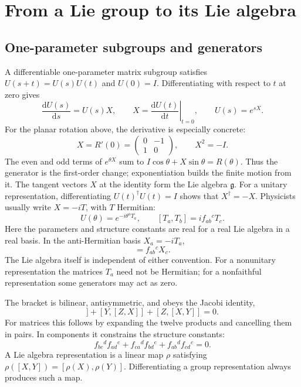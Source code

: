 \documentclass[11pt]{article}
\newcommand{\dd}{\mathrm{d}}
\newcommand{\lieg}{\mathfrak g}
\begin{document}
\section{From a Lie group to its Lie algebra}
\label{sec:algebra}
\subsection{One-parameter subgroups and generators}
A differentiable one-parameter matrix subgroup satisfies
\(U(s+t)=U(s)U(t)\) and \(U(0)=I\). Differentiating with respect to \(t\)
at zero gives
\[
\frac{\dd U(s)}{\dd s}=U(s)X,
\qquad X=\left.\frac{\dd U(t)}{\dd t}\right|_{t=0},
\qquad U(s)=e^{sX}.
\]
For the planar rotation above, the derivative is especially concrete:
\[
 X=R'(0)=\begin{pmatrix}0&-1\\1&0\end{pmatrix},\qquad X^2=-I.
\]
The even and odd terms of \(e^{\theta X}\) sum to
\(I\cos\theta+X\sin\theta=R(\theta)\). Thus the generator is the
first-order change; exponentiation builds the finite motion from it.
The tangent vectors \(X\) at the identity form the Lie algebra
\(\lieg\). For a unitary representation, differentiating
\(U(t)^\dagger U(t)=I\) shows that \(X^\dagger=-X\).
Physicists usually write \(X=-iT\), with \(T\) Hermitian:
\begin{equation}
 U(\theta)=e^{-i\theta^aT_a},
 \qquad [T_a,T_b]=i f_{ab}{}^cT_c.
 \label{eq:generator-convention}
\end{equation}
Here the parameters and structure constants are real for a real Lie
algebra in a real basis. In the anti-Hermitian basis \(X_a=-iT_a\),
\begin{equation}
 [X_a,X_b]=f_{ab}{}^cX_c.
 \label{eq:antihermitian}
\end{equation}
The Lie algebra itself is independent of either convention. For a
nonunitary representation the matrices \(T_a\) need not be Hermitian;
for a nonfaithful representation some generators may act as zero.

The bracket is bilinear, antisymmetric, and obeys the Jacobi identity,
\begin{equation}
 [X,[Y,Z]]+[Y,[Z,X]]+[Z,[X,Y]]=0.
 \label{eq:jacobi}
\end{equation}
For matrices this follows by expanding the twelve products and cancelling
them in pairs. In components it constrains the structure constants:
\[
 f_{bc}{}^d f_{ad}{}^e+
 f_{ca}{}^d f_{bd}{}^e+
 f_{ab}{}^d f_{cd}{}^e=0.
\]
A Lie algebra representation is a linear map \(\rho\) satisfying
\(\rho([X,Y])=[\rho(X),\rho(Y)]\). Differentiating a group
representation always produces such a map.
\end{document}

